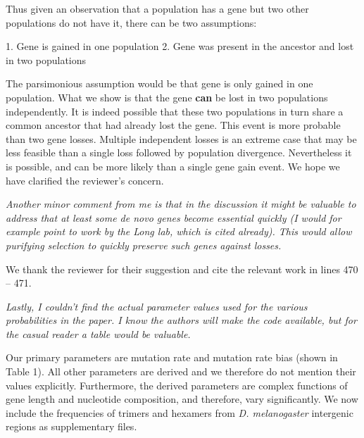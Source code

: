 \documentclass[12pt,a4paper]{article}
\begin{document}
Thus given an observation that a population has a gene but two other populations do not have it, there can be two assumptions:

1. Gene is gained in one population
2. Gene was present in the ancestor and lost in two populations

The parsimonious assumption would be that gene is only gained in one population. What we show is that the gene \textbf{can} be lost in two populations independently. It is indeed possible that these two populations in turn share a common ancestor that had already lost the gene. This event is more probable than two gene losses. Multiple independent losses is an extreme case that may be less feasible than a single loss followed by population divergence. Nevertheless it is possible, and can be more likely than a single gene gain event. We hope we have clarified the reviewer's concern.

{\itshape Another minor comment from me is that in the discussion it might be valuable to address that at least some de novo genes become essential quickly (I would for example point to work by the Long lab, which is cited already). This would allow purifying selection to quickly preserve such genes against losses.}

We thank the reviewer for their suggestion and cite the relevant work in lines 470 -- 471.

{\itshape Lastly, I couldn't find the actual parameter values used for the various probabilities in the paper. I know the authors will make the code available, but for the casual reader a table would be valuable.}

Our primary parameters are mutation rate and mutation rate bias (shown in Table 1). All other parameters are derived and we therefore do not mention their values explicitly. Furthermore, the derived parameters are complex functions of gene length and nucleotide composition, and therefore, vary significantly. We now include the frequencies of trimers and hexamers from \textit{D. melanogaster} intergenic regions as supplementary files. 
\end{document}
